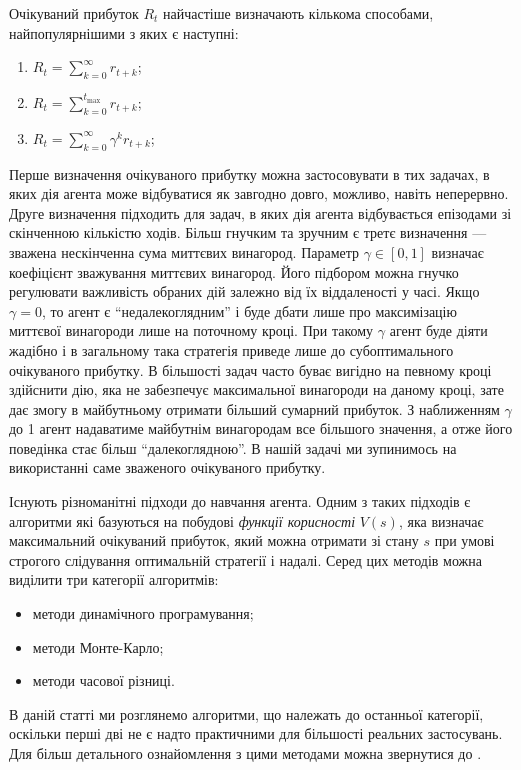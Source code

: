\documentclass[a4paper,10pt,fleqn]{article}
\begin{document}
Очікуваний прибуток $R_t$ найчастіше визначають кількома способами, найпопулярнішими з яких є наступні:
\begin{enumerate}
	\item $R_t = \sum\limits_{k=0}^{\infty}r_{t+k}$;
	\item $R_t = \sum\limits_{k=0}^{t_{\max}}r_{t+k}$;
	\item $R_t = \sum\limits_{k=0}^{\infty}\gamma^k r_{t+k}$;
\end{enumerate}

Перше визначення очікуваного прибутку можна застосовувати в тих задачах, в яких дія агента може відбуватися як завгодно довго, можливо, навіть неперервно. Друге визначення підходить для задач, в яких дія агента відбувається епізодами зі скінченною кількістю ходів. Більш гнучким та зручним є третє визначення --- зважена нескінченна сума миттєвих винагород. Параметр $\gamma \in [0,1]$ визначає коефіцієнт зважування миттєвих винагород. Його підбором можна гнучко регулювати важливість обраних дій залежно від їх віддаленості у часі. Якщо $\gamma = 0$, то агент є ``недалекоглядним'' і буде дбати лише про максимізацію миттєвої винагороди лише на поточному кроці. При такому $\gamma$ агент буде діяти жадібно і в загальному така стратегія приведе лише до субоптимального очікуваного прибутку. В більшості задач часто буває вигідно на певному кроці здійснити дію, яка не забезпечує максимальної винагороди на даному кроці, зате дає змогу в майбутньому отримати більший сумарний прибуток. З наближенням $\gamma$ до 1 агент надаватиме майбутнім винагородам все більшого значення, а отже його поведінка стає більш ``далекоглядною''. В нашій задачі ми зупинимось на використанні саме зваженого очікуваного прибутку.

Існують різноманітні підходи до навчання агента. Одним з таких підходів є алгоритми які базуються на побудові \emph{функції корисності} $V(s)$, яка визначає максимальний очікуваний прибуток, який можна отримати зі стану $s$ при умові строгого слідування оптимальній стратегії і надалі. Серед цих методів можна виділити три категорії алгоритмів:

\begin{itemize}
\item методи динамічного програмування;
\item методи Монте-Карло;
\item методи часової різниці.
\end{itemize}

В даній статті ми розглянемо алгоритми, що належать до останньої категорії, оскільки перші дві не є надто практичними для більшості реальних застосувань. Для більш детального ознайомлення з цими методами можна звернутися до \cite{SuttonBarto2002}.
\end{document}
